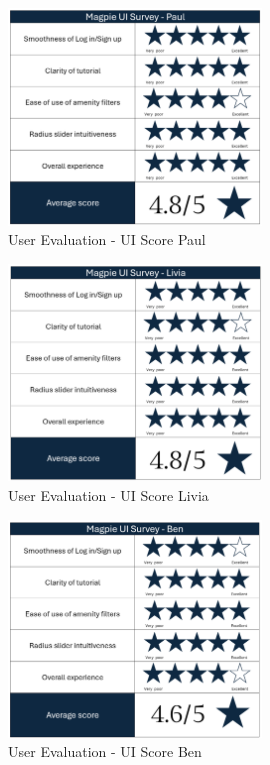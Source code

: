 \begin{figure}[h!]
    \centering
    \includegraphics[width=0.6\textwidth]{images/survey-paul.png}
    \caption{User Evaluation - UI Score Paul}
    \label{fig:paulscore}
\end{figure}
\begin{figure}[h!]
    \centering
    \includegraphics[width=0.6\textwidth]{images/survey-livia.png}
    \caption{User Evaluation - UI Score Livia}
    \label{fig:liviascore}
\end{figure}
\begin{figure}[h!]
    \centering
    \includegraphics[width=0.6\textwidth]{images/survey-ben.png}
    \caption{User Evaluation - UI Score Ben}
    \label{fig:benscore}
\end{figure}
